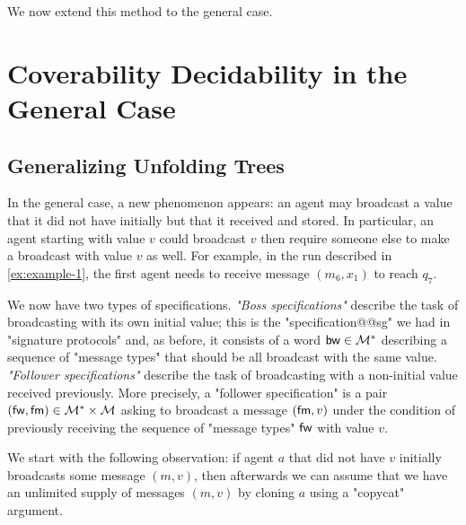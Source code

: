 We now extend this method to the general case. 


\section{Coverability Decidability in the General Case}
\label{sec:cover-general-case}

\subsection{Generalizing Unfolding Trees}
\label{sec:unfolding-trees-general}
In the general case, a new phenomenon appears: an agent may broadcast a value that it did not have initially but that it received and stored. In particular, an agent starting with value $v$ could broadcast $v$ then require someone else to make a broadcast with value $v$ as well. For example, in the run described in \cref{ex:example-1}, the first agent needs to receive message $(m_6, x_1)$ to reach $q_7$.

 We now have two types of specifications. \emph{"Boss specifications"} describe the task of broadcasting with its own initial value; this is the "specification@@sg" we had in "signature protocols" and, as before, it consists of a word $\mathsf{bw} \in \mathcal{M}^\ast$ describing a sequence of "message types" that should be all broadcast with the same value. \emph{"Follower specifications"} describe the task of broadcasting with a non-initial value received previously. More precisely, a "follower specification" is a pair $(\mathsf{fw}, \mathsf{fm}) \in \mathcal{M}^*\times \mathcal{M}$ asking to broadcast a message $(\mathsf{fm},v)$ under the condition of previously receiving the sequence of "message types" $\mathsf{fw}$ with value $v$.


We start with the following observation: if agent $a$ that did not have $v$ initially broadcasts some message $(m,v)$, then afterwards we can assume that we have an unlimited supply of messages $(m,v)$ by cloning $a$ using a "copycat" argument. 

